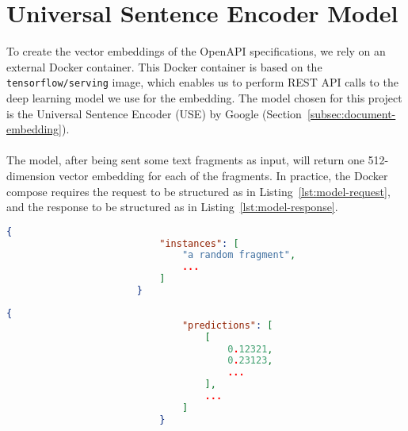 \section{Universal Sentence Encoder Model}\label{sec:use-model}

To create the vector embeddings of the OpenAPI specifications, we rely on an external Docker container.
This Docker container is based on the \verb|tensorflow/serving| image, which enables us to perform REST API calls to the deep learning model we use for the embedding.
The model chosen for this project is the Universal Sentence Encoder (USE) by Google (Section~\ref{subsec:document-embedding}). \\ \\
The model, after being sent some text fragments as input, will return one 512-dimension vector embedding for each of the fragments.
In practice, the Docker compose requires the request to be structured as in Listing~\ref{lst:model-request}, and the response to be structured as in Listing~\ref{lst:model-response}.

\begin{center}
    \begin{lstlisting}[label={lst:model-request},language=json,caption={Example of request body sent to the model},captionpos=b]
                       {
                           "instances": [
                               "a random fragment",
                               ...
                           ]
                       }
    \end{lstlisting}
\end{center}

\begin{center}
    \begin{lstlisting}[label={lst:model-response},language=json,caption={Example of response body sent to the model},captionpos=b]
                           {
                               "predictions": [
                                   [
                                       0.12321,
                                       0.23123,
                                       ...
                                   ],
                                   ...
                               ]
                           }
    \end{lstlisting}
\end{center}

